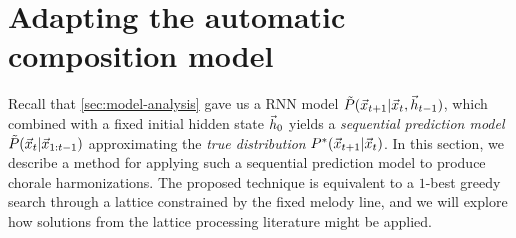 

\section{Adapting the automatic composition model}


Recall that \cref{sec:model-analysis} gave us a RNN model
$\tilde{P}(\vec{x}_{t+1} | \vec{x}_{t}, \vec{h}_{t-1})$, which combined with a fixed
initial hidden state $\vec{h}_0$ yields a \emph{sequential prediction model}
$\tilde{P}(\vec{x}_t | \vec{x}_{1:t-1})$ approximating the \emph{true distribution}
$P^*(\vec{x}_{t+1} | \vec{x}_{t})$. In this section, we describe a method for applying
such a sequential prediction model to produce chorale harmonizations. The
proposed technique is equivalent to a $1$-best greedy search through a lattice
constrained by the fixed melody line, and we will explore how solutions from
the lattice processing literature might be applied.

